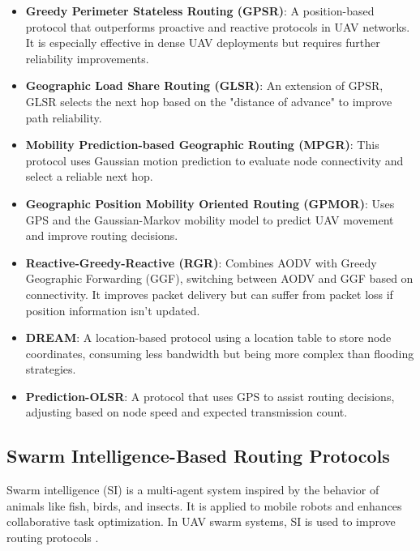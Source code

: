 \begin{itemize}
    \item \textbf{Greedy Perimeter Stateless Routing (GPSR)}: A position-based protocol that outperforms proactive and reactive protocols in UAV networks. It is especially effective in dense UAV deployments but requires further reliability improvements.
    
    \item \textbf{Geographic Load Share Routing (GLSR)}: An extension of GPSR, GLSR selects the next hop based on the "distance of advance" to improve path reliability.
    
    \item \textbf{Mobility Prediction-based Geographic Routing (MPGR)}: This protocol uses Gaussian motion prediction to evaluate node connectivity and select a reliable next hop.
    
    \item \textbf{Geographic Position Mobility Oriented Routing (GPMOR)}: Uses GPS and the Gaussian-Markov mobility model to predict UAV movement and improve routing decisions.
    
    \item \textbf{Reactive-Greedy-Reactive (RGR)}: Combines AODV with Greedy Geographic Forwarding (GGF), switching between AODV and GGF based on connectivity. It improves packet delivery but can suffer from packet loss if position information isn't updated.
    
    \item \textbf{DREAM}: A location-based protocol using a location table to store node coordinates, consuming less bandwidth but being more complex than flooding strategies.
    
    \item \textbf{Prediction-OLSR}: A protocol that uses GPS to assist routing decisions, adjusting based on node speed and expected transmission count.
\end{itemize}


\subsection{Swarm Intelligence-Based Routing Protocols}

Swarm intelligence (SI) is a multi-agent system inspired by the behavior of animals like fish, birds, and insects. It is applied to mobile robots and enhances collaborative task optimization. In UAV swarm systems, SI is used to improve routing protocols \cite{zungerua2012classical}.

